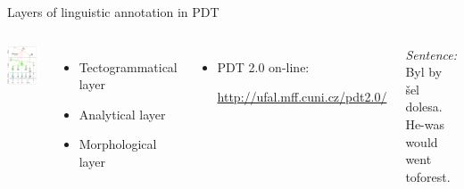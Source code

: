 \documentclass[xcolor=dvipsnames]{beamer}
\begin{document}
\begin{frame}{Layers of linguistic annotation in PDT}
\begin{columns}
\includegraphics[height=0.9\vsize]{img/PDT_layers}
\begin{itemize}
	\item Tectogrammatical layer
	\item Analytical layer
	\item Morphological layer
\end{itemize}
\begin{itemize}
	\item PDT 2.0 on-line:\\\centerline{\scriptsize\url{http://ufal.mff.cuni.cz/pdt2.0/}} 
\end{itemize}
\vspace{2cm}
\emph{Sentence:}
\medskip
\\Byl by šel dolesa.
\\He-was would went toforest.
\end{columns}
\end{frame}
\end{document}
